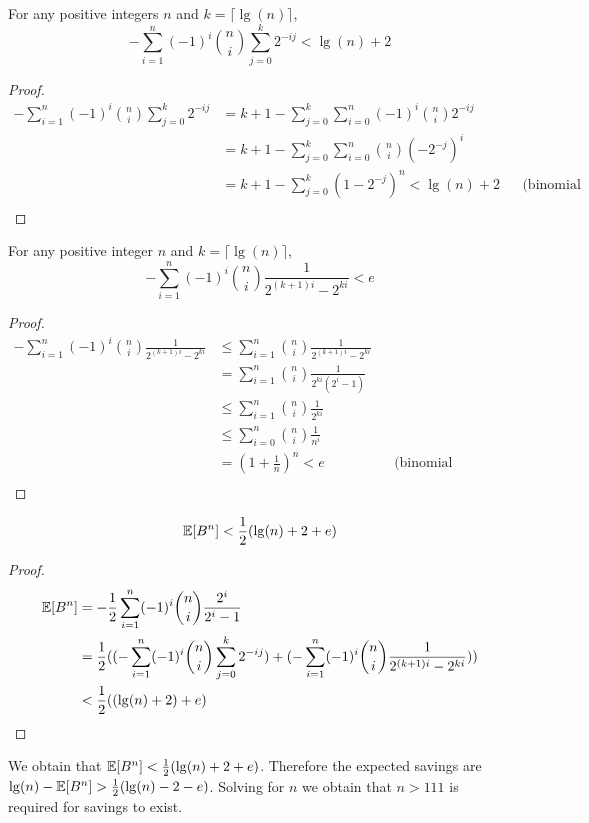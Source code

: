 \begin{lemma}
  For any positive integers $n$ and $k=\lceil \lg(n) \rceil$,
  \[
    -\sum_{i=1}^n (-1)^i {n \choose i} \sum_{j=0}^k 2^{-ij} < \lg(n) + 2
  \]
\end{lemma}
\begin{proof}
  \begin{align*}
    -\sum_{i=1}^n (-1)^i {n \choose i} \sum_{j=0}^k 2^{-ij}
    &= k+1 - \sum_{j=0}^k \sum_{i=0}^n (-1)^i {n \choose i} 2^{-ij} \\
    &= k+1 - \sum_{j=0}^k \sum_{i=0}^n {n \choose i} (-2^{-j})^i \\
    &= k+1 - \sum_{j=0}^k (1-2^{-j})^n < \lg(n) + 2 && \text{(binomial expansion)} \\
  \end{align*}
\end{proof}

\begin{lemma}
  For any positive integer $n$ and $k=\lceil \lg(n) \rceil$,
  \[
    -\sum_{i=1}^n (-1)^i {n \choose i} \frac{1}{2^{(k+1)i} - 2^{ki}} < e
  \]
\end{lemma}
\begin{proof}
  \begin{align*}
    -\sum_{i=1}^n (-1)^i {n \choose i} \frac{1}{2^{(k+1)i} - 2^{ki}}
    &\le \sum_{i=1}^n {n \choose i} \frac{1}{2^{(k+1)i} - 2^{ki}} \\
    &= \sum_{i=1}^n {n \choose i} \frac{1}{2^{ki}(2^i-1)} \\
    &\le \sum_{i=1}^n {n \choose i} \frac{1}{2^{ki}} \\
    &\le \sum_{i=0}^n {n \choose i} \frac{1}{n^i} \\
    &= (1+\frac{1}{n})^n < e && \text{(binomial expansion)} \\
  \end{align*}
\end{proof}

\begin{theorem}
  \[
    \operatorname{\mathbb{E}}[B^n] < \frac{1}{2}(\lg(n)+2+e)
  \]
\end{theorem}
\begin{proof}
  \begin{align*}
    \operatorname{\mathbb{E}}[B^n]
    &= -\frac{1}{2} \sum_{i = 1}^n (-1)^i {n \choose i} \frac{2^i}{2^i - 1} \\
    &= \frac{1}{2}((-\sum_{i=1}^n (-1)^i {n \choose i} \sum_{j=0}^k 2^{-ij}) + (-\sum_{i=1}^n (-1)^i {n \choose i} \frac{1}{2^{(k+1)i} - 2^{ki}})) \\
    &< \frac{1}{2}((\lg(n) + 2) + e)
  \end{align*}
\end{proof}

We obtain that $\operatorname{\mathbb{E}}[B^n] < \frac{1}{2}(\lg(n)+2+e)$. Therefore the expected savings are $\lg(n) - \operatorname{\mathbb{E}}[B^n] > \frac{1}{2}(\lg(n)-2-e)$. Solving for $n$ we obtain that $n > 111$ is required for savings to exist.
